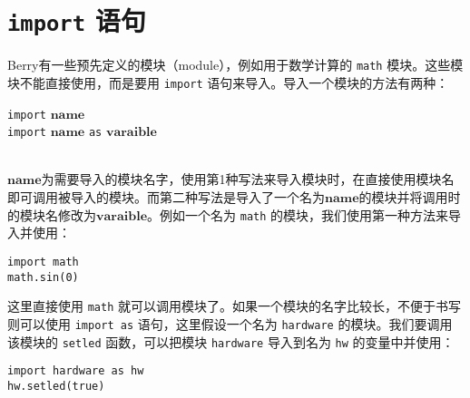 \section{\texttt{import} 语句}

Berry有一些预先定义的模块（module），例如用于数学计算的 \texttt{math} 模块。这些模块不能直接使用，而是要用 \texttt{import} 语句来导入。导入一个模块的方法有两种：
\begin{algorithm}
    \texttt{import} $\bm{name}$ \\
    \texttt{import} $\bm{name}$ \texttt{as} $\bm{varaible}$
\end{algorithm}\vspace{-0.6em}\\
$\bm{name}$为需要导入的模块名字，使用第1种写法来导入模块时，在直接使用模块名即可调用被导入的模块。而第二种写法是导入了一个名为$\bm{name}$的模块并将调用时的模块名修改为$\bm{varaible}$。例如一个名为 \texttt{math} 的模块，我们使用第一种方法来导入并使用：
\begin{lstlisting}[language=berry, numbers=none]
import math
math.sin(0)
\end{lstlisting}
这里直接使用 \texttt{math} 就可以调用模块了。如果一个模块的名字比较长，不便于书写则可以使用 \texttt{import as} 语句，这里假设一个名为 \texttt{hardware} 的模块。我们要调用该模块的 \texttt{setled} 函数，可以把模块 \texttt{hardware} 导入到名为 \texttt{hw} 的变量中并使用：
\begin{lstlisting}[language=berry, numbers=none]
import hardware as hw
hw.setled(true)
\end{lstlisting}
